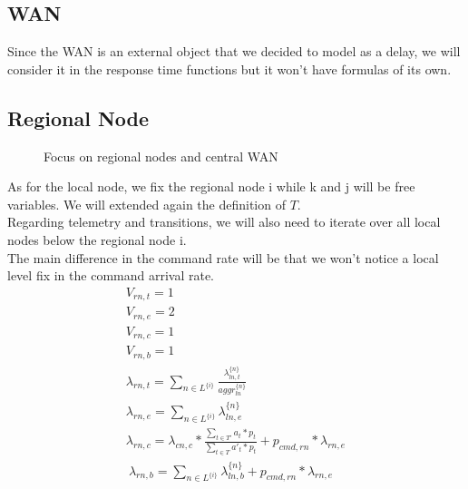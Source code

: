 \documentclass[11pt]{article}
\begin{document}
\subsection{WAN}
Since the WAN is an external object that we decided to model as a delay, we will consider it in the response time functions but it won't have formulas of its own.
\subsection{Regional Node}
\begin{figure}[H]
	\centering
	\hspace*{-3.7cm}
	\frame{}
	\caption{Focus on regional nodes and central WAN}
\end{figure}
As for the local node, we fix the regional node i while k and j will be free variables. We will extended again the definition of $T$.\\
Regarding telemetry and transitions, we will also need to iterate over all local nodes below the regional node i.\\
The main difference in the command rate will be that we won't notice a local level fix in the command arrival rate.
\begin{equation}
	\begin{array}{l}
		V_{rn, t} = 1 \\
		V_{rn, e} = 2 \\ %
		V_{rn, c} = 1 \\
		V_{rn, b} = 1 \\
        \lambda_{rn, t} = \sum\limits_{n \in L^{\{i\}}}{\frac{\lambda^{\{n\}}_{ln, t}}{aggr^{\{n\}}_{ln}}}  \\
        \lambda_{rn, e} = \sum\limits_{n \in L^{\{i\}}}{\lambda^{\{n\}}_{ln, e}} \\
		\lambda_{rn, c} = \lambda_{cn, c} * \frac{\sum\limits_{t \in T'}{a_{t} * p_{t}}}{\sum\limits_{t \in T}{a'_{t} * p_{t}}} + p_{cmd,rn} * \lambda_{rn, e} \\\
        \lambda_{rn, b} = \sum\limits_{n \in L^{\{ i \}}}{\lambda^{\{ n \}}_{ln, b}} + p_{cmd, rn} * \lambda_{rn,e}

	\end{array}
\end{equation}
\end{document}
